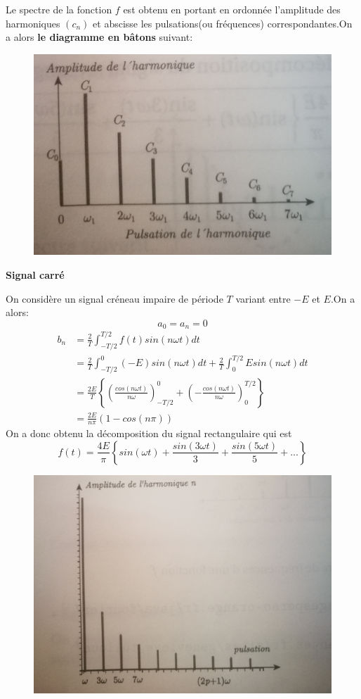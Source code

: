 \documentclass[12pt]{book}
\theoremstyle{definition}\newtheorem{dfn}{Définition}[chapter]
\theoremstyle{plain}\newtheorem{thm}{Théorème}[chapter]
\theoremstyle{plain}\newtheorem{prp}{Proposition}[chapter]
\theoremstyle{plain}\newtheorem{lem}{\bf Lemme}[chapter]
\theoremstyle{plain}\newtheorem{axm}{\bf Axiome}[chapter]
\theoremstyle{plain}\newtheorem{lmm}{\bf Lemme}[chapter]
\theoremstyle{plain}\newtheorem{cor}{\bf Corollaire}[chapter]
\theoremstyle{remark}\newtheorem{rem}{Remarque}[chapter]
\begin{document}
Le spectre de la fonction $f$ est obtenu en portant en ordonnée l'amplitude des harmoniques $(c_n)$ et abscisse les pulsations(ou fréquences) correspondantes.On a alors \textbf{le diagramme en bâtons} suivant:
\begin{figure}[H]
	\centering
	\includegraphics[scale=0.1]{image//Analyse de Fourier d'un signal periodique//1}
\end{figure}

\textbf{Signal carré}

On considère un signal créneau impaire de période $T$ variant entre $-E$ et $E$.On a alors:
$$
a_0=a_n=0
$$
$$
\begin{aligned}
b_n&=\frac{2}{T}\int_{-T/2}^{T/2}f(t)sin(n\omega t)dt\\
&=\frac{2}{T}\int_{-T/2}^{0}(-E)sin(n\omega t)dt+\frac{2}{T}\int_{0}^{T/2}Esin(n\omega t)dt\\
&=\frac{2E}{T}\left \{ \left(\frac{cos(n\omega t)}{n\omega}\right)_{-T/2}^0+\left(-\frac{cos(n\omega t)}{n\omega}\right)_0^{T/2} \right \} \\
&=\frac{2E}{n\pi}(1-cos(n\pi))
\end{aligned}
$$
On a donc obtenu la décomposition du signal rectangulaire qui est 
$$
\boxed{f(t)=\frac{4E}{\pi}\left \{ sin(\omega t) +\frac{sin(3\omega t)}{3}+\frac{sin(5\omega t)}{5}+...\right \} }
$$
\begin{figure}[H]
	\centering
	\includegraphics[scale=0.1]{image//Analyse de Fourier d'un signal periodique//2}
\end{figure}
\end{document}
